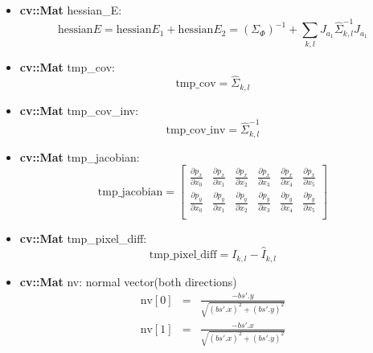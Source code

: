\documentclass[11pt]{article}
\begin{document}
\begin{itemize}
\item \textbf{cv::Mat} hessian\_E:
\label{sec-1_1_2_7}%
\begin{displaymath}
\mathrm{hessian} E = \mathrm{hessian} {E_1} + \mathrm{hessian} {E_2}
           = (\Sigma_\Phi)^{-1} +
           \sum_{k,l} J_{a_1} \hat{\Sigma}_{k,l}^{-1} J_{a_1}
\end{displaymath}

\item \textbf{cv::Mat} tmp\_cov:
\label{sec-1_1_2_8}%
\begin{displaymath}
\mathrm{tmp\_cov} = \hat{\Sigma}_{k,l}
\end{displaymath}

\item \textbf{cv::Mat} tmp\_cov\_inv:
\label{sec-1_1_2_9}%
\begin{displaymath}
\mathrm{tmp\_cov\_inv} = \hat{\Sigma}_{k,l}^{-1}
\end{displaymath}


\item \textbf{cv::Mat} tmp\_jacobian:\\
\label{sec-1_1_2_10}%
\begin{displaymath}
\mathrm{tmp\_jacobian} =
\left[ {\begin{array}{cccccc}
\frac{\partial p_x}{\partial x_0}& \frac{\partial p_x}{\partial x_1}& \frac{\partial p_x}{\partial x_2}& \frac{\partial p_x}{\partial x_3}&\frac{\partial p_x}{\partial x_4} &\frac{\partial p_x}{\partial x_5}  \\
\frac{\partial p_y}{\partial x_0}& \frac{\partial p_y}{\partial x_1}& \frac{\partial p_y}{\partial x_2}& \frac{\partial p_y}{\partial x_3}&\frac{\partial p_y}{\partial x_4} &\frac{\partial p_y}{\partial x_5}  \\
 \end{array} } \right]
\end{displaymath}


\item \textbf{cv::Mat} tmp\_pixel\_diff:
\label{sec-1_1_2_11}%
\begin{displaymath}
\mathrm{tmp\_pixel\_diff} = I_{k,l} - \hat{I}_{k,l}
\end{displaymath}


\item \textbf{cv::Mat} nv: normal vector(both directions)
\label{sec-1_1_2_12}%
\begin{eqnarray}
\mathrm{nv}[0] &=& \frac{ -bs'.y}{\sqrt{(bs'.x)^2 + (bs'.y)^2}}\\
\mathrm{nv}[1] &=& \frac{ -bs'.x}{\sqrt{(bs'.x)^2 + (bs'.y)^2}}
\end{eqnarray}



\end{itemize}
\end{document}
